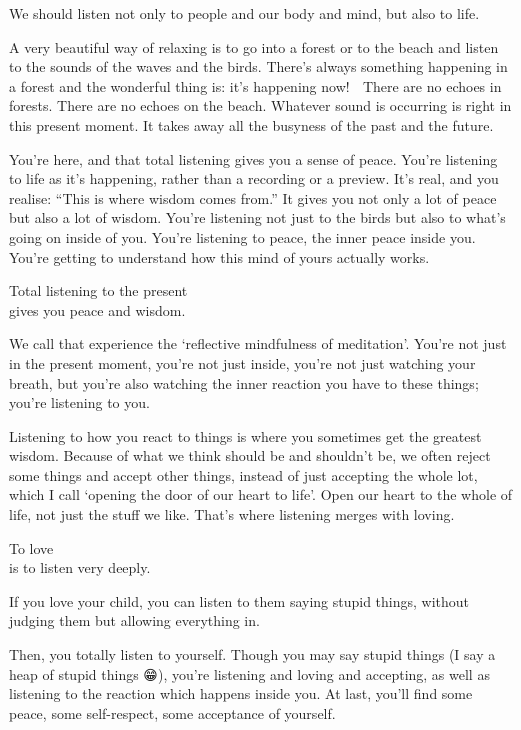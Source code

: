 \documentclass[12pt, openany]{book}
\newenvironment{aphorism}%
{%
\begin{center}\begin{itshape}
}%
{\end{itshape}\end{center}
}%
\begin{document}
We should listen not only to people and our body and mind, but also to life. 

A very beautiful way of relaxing is to go into a forest or to the beach and listen to the sounds of the waves and the birds. There’s always something happening in a forest and the wonderful thing is: it’s happening now! 🤩 There are no echoes in forests. There are no echoes on the beach. Whatever sound is occurring is right in this present moment. It takes away all the busyness of the past and the future. 

You’re here, and that total listening gives you a sense of peace. You’re listening to life as it’s happening, rather than a recording or a preview. It’s real, and you realise: “This is where wisdom comes from.” It gives you not only a lot of peace but also a lot of wisdom. You’re listening not just to the birds but also to what’s going on inside of you. You’re listening to peace, the inner peace inside you. You’re getting to understand how this mind of yours actually works. 

\begin{aphorism}
Total listening to the present\\  
gives you peace and wisdom.
\end{aphorism}

We call that experience the ‘reflective mindfulness of meditation’. You’re not just in the present moment, you’re not just inside, you’re not just watching your breath, but you’re also watching the inner reaction you have to these things; you’re listening to you. 

Listening to how you react to things is where you sometimes get the greatest wisdom. Because of what we think should be and shouldn’t be, we often reject some things and accept other things, instead of just accepting the whole lot, which I call ‘opening the door of our heart to life’. Open our heart to the whole of life, not just the stuff we like. That’s where listening merges with loving. 

\begin{aphorism}
To love\\  
is to listen very deeply.
\end{aphorism}

If you love your child, you can listen to them saying stupid things, without judging them but allowing everything in. 

Then, you totally listen to yourself. Though you may say stupid things (I say a heap of stupid things 😁), you’re listening and loving and accepting, as well as listening to the reaction which happens inside you. At last, you’ll find some peace, some self-respect, some acceptance of yourself. 
\end{document}

